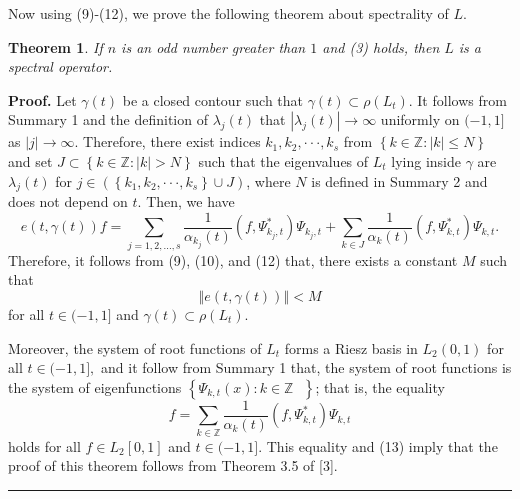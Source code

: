 \documentclass{article}%
\newtheorem{theorem}{Theorem}
{}
\newenvironment{proof}[1][Proof]{\textbf{#1.} }{\ \rule{0.5em}{0.5em}}
\begin{document}
Now using (9)-(12), we prove the following theorem about spectrality of $L.$

\begin{theorem}
If $n$ is an odd number greater than $1$ and (3) holds, then $L$ is a spectral operator.
\end{theorem}

\begin{proof}
Let $\gamma(t)$ be a closed contour such that $\gamma(t)\subset\rho\left(
L_{t}\right)  $. It follows from Summary 1 and the definition of $\lambda
_{j}(t)$ that $\left\vert \lambda_{j}(t)\right\vert \rightarrow\infty$
uniformly on $(-1,1]$ as $\left\vert j\right\vert \rightarrow\infty.$
Therefore, there exist indices $k_{1},k_{2},\cdot\cdot\cdot,k_{s}$ from
$\left\{  k\in\mathbb{Z}:\left\vert k\right\vert \leq N\right\}  $ and set
$J\subset\left\{  k\in\mathbb{Z}:\left\vert k\right\vert >N\right\}  $ such
that the eigenvalues of $L_{t}$ lying inside $\gamma$ are $\lambda_{j}(t)$ for
$j\in\left(  \left\{  k_{1},k_{2},\cdot\cdot\cdot,k_{s}\right\}  \cup
J\right)  $, where $N$ is defined in Summary 2 and does not depend on $t$.
Then, we have
\[
e(t,\gamma(t))f=%
{\textstyle\sum\limits_{j=1,2,...,s}}
\frac{1}{\alpha_{k_{j}}(t)}(f,\Psi_{k_{j},t}^{\ast})\Psi_{k_{j},t}+%
{\textstyle\sum\limits_{k\in J}}
\frac{1}{\alpha_{k}(t)}(f,\Psi_{k,t}^{\ast})\Psi_{k,t}.
\]
Therefore, it follows from (9), (10), and (12) that, there exists a constant
$M$ such that
\begin{equation}
\left\Vert e(t,\gamma(t))\right\Vert <M \tag{13}%
\end{equation}
for all $t\in(-1,1]$ and $\gamma(t)\subset\rho\left(  L_{t}\right)  .$

Moreover, the system of root functions of $L_{t}$ forms a Riesz basis in
$L_{2}(0,1)$ for all $t\in(-1,1],$ and it follow from Summary 1 that, the
system of root functions is the system of eigenfunctions $\left\{  \Psi
_{k,t}(x):k\in\mathbb{Z}\text{ }\right\}  $; that is, the equality
\[
f=%
{\textstyle\sum\limits_{k\in\mathbb{Z}}}
\frac{1}{\alpha_{k}(t)}(f,\Psi_{k,t}^{\ast})\Psi_{k,t}%
\]
holds for all $f\in L_{2}[0,1]$ and $t\in(-1,1].$ This equality and (13) imply
that the proof of this theorem follows from Theorem 3.5 of [3].
\end{proof}
\end{document}
